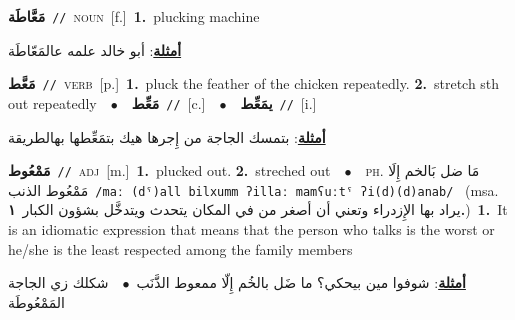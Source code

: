 \documentclass[10pt,a4paper,twoside]{article} %
\begin{document}
\begin{multicols}{2}
{\setlength\topsep{0pt}\textbf{\foreignlanguage{arabic}{مَعَّاطَة}}\ {\color{gray}\texttt{//}\color{black}}\ \textsc{noun}\ [f.]\ \textbf{1.}~plucking machine\  \begin{flushright}\color{gray}\foreignlanguage{arabic}{\textbf{\underline{\foreignlanguage{arabic}{أمثلة}}}: أبو خالد علمه عالمَعّاطَة}\end{flushright}\color{black}} \vspace{2mm}

{\setlength\topsep{0pt}\textbf{\foreignlanguage{arabic}{مَعَّط}}\ {\color{gray}\texttt{//}\color{black}}\ \textsc{verb}\ [p.]\ \textbf{1.}~pluck the feather of the chicken repeatedly.  \textbf{2.}~stretch sth out repeatedly\ \ $\bullet$\ \ \setlength\topsep{0pt}\textbf{\foreignlanguage{arabic}{مَعِّط}}\ {\color{gray}\texttt{//}\color{black}}\ [c.]\ \ $\bullet$\ \ \setlength\topsep{0pt}\textbf{\foreignlanguage{arabic}{يمَعِّط}}\ {\color{gray}\texttt{//}\color{black}}\ [i.]\  \begin{flushright}\color{gray}\foreignlanguage{arabic}{\textbf{\underline{\foreignlanguage{arabic}{أمثلة}}}: بتمسك الجاجة من إِجرها هيك بتمَعِّطها بهالطريقة}\end{flushright}\color{black}} \vspace{2mm}

{\setlength\topsep{0pt}\textbf{\foreignlanguage{arabic}{مَمْعُوط}}\ {\color{gray}\texttt{//}\color{black}}\ \textsc{adj}\ [m.]\ \textbf{1.}~plucked out.  \textbf{2.}~streched out\ \ $\bullet$\ \ \textsc{ph.} \color{gray} \foreignlanguage{arabic}{مَا ضل بَالخم إِلَا مَمْعُوط الذنب}\color{black}\ {\color{gray}\texttt{/{\sffamily maː (dˤ)all bilxumm ʔillaː mamʕuːtˤ ʔi(d)(d)anab}/}\color{black}}\ \color{gray} (msa. \foreignlanguage{arabic}{يراد بها الإِزدراء وتعني أن أصغر من في المكان يتحدث ويتدخَّل بشؤون الكبار}~\foreignlanguage{arabic}{\textbf{١.}})\color{black}\ \textbf{1.}~It is an idiomatic expression that means that the person who talks is the worst or he/she is the least respected among the family members\  \begin{flushright}\color{gray}\foreignlanguage{arabic}{\textbf{\underline{\foreignlanguage{arabic}{أمثلة}}}: شوفوا مين بيحكي؟ ما ضَل بالخُم إِلّا ممعوط الذَّنَب\ $\bullet$\ \  شكلك زي الجاجة المَمْعُوطَة}\end{flushright}\color{black}} \vspace{2mm}


\end{multicols}
\end{document}
